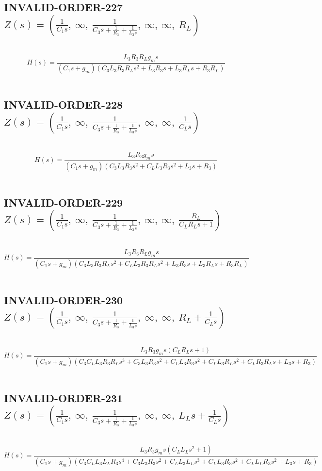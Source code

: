 \documentclass{article}
\begin{document}
\subsection{INVALID-ORDER-227 $Z(s) = \left( \frac{1}{C_{1} s}, \  \infty, \  \frac{1}{C_{3} s + \frac{1}{R_{3}} + \frac{1}{L_{3} s}}, \  \infty, \  \infty, \  R_{L}\right)$ } \ 
\textbf{\[H(s) = \frac{L_{3} R_{3} R_{L} g_{m} s}{\left(C_{1} s + g_{m}\right) \left(C_{3} L_{3} R_{3} R_{L} s^{2} + L_{3} R_{3} s + L_{3} R_{L} s + R_{3} R_{L}\right)}\] } \ 
\subsection{INVALID-ORDER-228 $Z(s) = \left( \frac{1}{C_{1} s}, \  \infty, \  \frac{1}{C_{3} s + \frac{1}{R_{3}} + \frac{1}{L_{3} s}}, \  \infty, \  \infty, \  \frac{1}{C_{L} s}\right)$ } \ 
\textbf{\[H(s) = \frac{L_{3} R_{3} g_{m} s}{\left(C_{1} s + g_{m}\right) \left(C_{3} L_{3} R_{3} s^{2} + C_{L} L_{3} R_{3} s^{2} + L_{3} s + R_{3}\right)}\] } \ 
\subsection{INVALID-ORDER-229 $Z(s) = \left( \frac{1}{C_{1} s}, \  \infty, \  \frac{1}{C_{3} s + \frac{1}{R_{3}} + \frac{1}{L_{3} s}}, \  \infty, \  \infty, \  \frac{R_{L}}{C_{L} R_{L} s + 1}\right)$ } \ 
\textbf{\[H(s) = \frac{L_{3} R_{3} R_{L} g_{m} s}{\left(C_{1} s + g_{m}\right) \left(C_{3} L_{3} R_{3} R_{L} s^{2} + C_{L} L_{3} R_{3} R_{L} s^{2} + L_{3} R_{3} s + L_{3} R_{L} s + R_{3} R_{L}\right)}\] } \ 
\subsection{INVALID-ORDER-230 $Z(s) = \left( \frac{1}{C_{1} s}, \  \infty, \  \frac{1}{C_{3} s + \frac{1}{R_{3}} + \frac{1}{L_{3} s}}, \  \infty, \  \infty, \  R_{L} + \frac{1}{C_{L} s}\right)$ } \ 
\textbf{\[H(s) = \frac{L_{3} R_{3} g_{m} s \left(C_{L} R_{L} s + 1\right)}{\left(C_{1} s + g_{m}\right) \left(C_{3} C_{L} L_{3} R_{3} R_{L} s^{3} + C_{3} L_{3} R_{3} s^{2} + C_{L} L_{3} R_{3} s^{2} + C_{L} L_{3} R_{L} s^{2} + C_{L} R_{3} R_{L} s + L_{3} s + R_{3}\right)}\] } \ 
\subsection{INVALID-ORDER-231 $Z(s) = \left( \frac{1}{C_{1} s}, \  \infty, \  \frac{1}{C_{3} s + \frac{1}{R_{3}} + \frac{1}{L_{3} s}}, \  \infty, \  \infty, \  L_{L} s + \frac{1}{C_{L} s}\right)$ } \ 
\textbf{\[H(s) = \frac{L_{3} R_{3} g_{m} s \left(C_{L} L_{L} s^{2} + 1\right)}{\left(C_{1} s + g_{m}\right) \left(C_{3} C_{L} L_{3} L_{L} R_{3} s^{4} + C_{3} L_{3} R_{3} s^{2} + C_{L} L_{3} L_{L} s^{3} + C_{L} L_{3} R_{3} s^{2} + C_{L} L_{L} R_{3} s^{2} + L_{3} s + R_{3}\right)}\] } \ 
\end{document}
